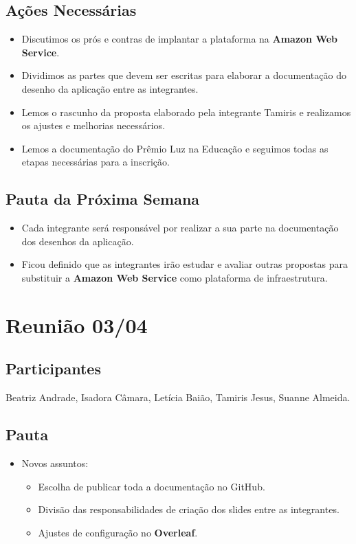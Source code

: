 \begin{apendicesenv}
\subsection*{Ações Necessárias}
\begin{itemize}
    \item Discutimos os prós e contras de implantar a plataforma na \textbf{Amazon Web Service}.
    \item Dividimos as partes que devem ser escritas para elaborar a documentação do desenho da aplicação entre as integrantes.
    \item Lemos o rascunho da proposta elaborado pela integrante Tamiris e realizamos os ajustes e melhorias necessários.
    \item Lemos a documentação do Prêmio Luz na Educação e seguimos todas as etapas necessárias para a inscrição.
\end{itemize}

\subsection*{Pauta da Próxima Semana}
\begin{itemize}
    \item Cada integrante será responsável por realizar a sua parte na documentação dos desenhos da aplicação.
    \item Ficou definido que as integrantes irão estudar e avaliar outras propostas para substituir a \textbf{Amazon Web Service} como plataforma de infraestrutura.
\end{itemize}

\section*{Reunião 03/04}

\subsection*{Participantes}
Beatriz Andrade, Isadora Câmara, Letícia Baião, Tamiris Jesus, Suanne Almeida.

\subsection*{Pauta}
\begin{itemize}
    \item Novos assuntos:
    \begin{itemize}
        \item Escolha de publicar toda a documentação no GitHub.
        \item Divisão das responsabilidades de criação dos slides entre as integrantes.
        \item Ajustes de configuração no \textbf{Overleaf}.
    \end{itemize}
\end{itemize}


\end{apendicesenv}
